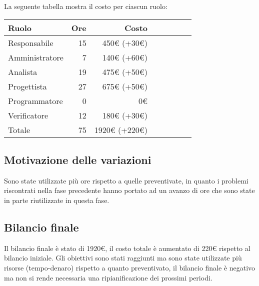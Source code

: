 La seguente tabella mostra il costo per ciascun ruolo:
\begin{table}[ht]
    \begin{tabularx}{\linewidth}{X|rrrrrrr}
    \rowcolor{gray!30}Ruolo & Ore & Costo \\
    \hline
    Responsabile                            & 15   & 450€ (+30€)\\
    \rowcolor{gray!10}Amministratore        & 7    & 140€ (+60€)\\
    Analista                                & 19   & 475€ (+50€)\\
    \rowcolor{gray!10}Progettista           & 27   & 675€ (+50€)\\
    Programmatore                           & 0    & 0€ \\
    \rowcolor{gray!10}Verificatore          & 12   & 180€ (+30€) \\
    \hline Totale                           & 75   & 1920€ (+220€) \\ 
    \end{tabularx}
\end{table}

\subsection{Motivazione delle variazioni}
Sono state utilizzate più ore rispetto a quelle preventivate, in quanto i problemi riscontrati nella fase precedente hanno portato ad un avanzo di ore che sono state in parte riutilizzate in questa fase.

\subsection{Bilancio finale}
Il bilancio finale è stato di 1920€, il costo totale è aumentato di 220€ rispetto al bilancio iniziale. Gli obiettivi sono stati raggiunti ma sono state utilizzate più risorse (tempo-denaro) rispetto a quanto preventivato, il bilancio finale è negativo ma non si rende necessaria una ripianificazione dei prossimi periodi.
